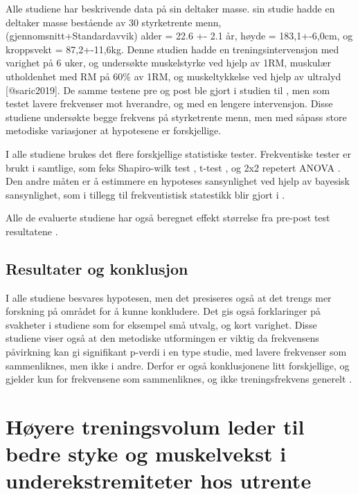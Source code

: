 \documentclass[
]{book}
\begin{document}
Alle studiene har beskrivende data på sin deltaker masse. \citep{saric2019} sin studie hadde en deltaker masse bestående av 30 styrketrente menn, (gjennomsnitt+Standardavvik) alder = 22.6 +- 2.1 år, høyde = 183,1+-6,0cm, og kroppsvekt = 87,2+-11,6kg. Denne studien hadde en treningsintervensjon med varighet på 6 uker, og undersøkte muskelstyrke ved hjelp av 1RM, muskulær utholdenhet med RM på 60\% av 1RM, og muskeltykkelse ved hjelp av ultralyd {[}@saric2019{]}. De samme testene pre og post ble gjort i studien til \citep{brigatto2019}, men som testet lavere frekvenser mot hverandre, og med en lengere intervensjon. Disse studiene undersøkte begge frekvens på styrketrente menn, men med såpass store metodiske variasjoner at hypotesene er forskjellige.

I alle studiene brukes det flere forskjellige statistiske tester. Frekventiske tester er brukt i samtlige, som feks Shapiro-wilk test \citep{brigatto2019, johnsen2021, lasevicius2019}, t-test \citet{brigatto2019}, og 2x2 repetert ANOVA \citep{brigatto2019, johnsen2021} . Den andre måten er å estimmere en hypoteses sansynlighet ved hjelp av bayesisk sansynlighet, som i tillegg til frekventistisk statestikk blir gjort i \citep{saric2019}.

Alle de evaluerte studiene har også beregnet effekt størrelse fra pre-post test resultatene \citep{brigatto2019, gentil2018, johnsen2021, saric2019, lasevicius2019}.

\hypertarget{resultater-og-konklusjon}{%
\section{\texorpdfstring{\textbf{Resultater og konklusjon}}{Resultater og konklusjon}}\label{resultater-og-konklusjon}}

I alle studiene besvares hypotesen, men det presiseres også at det trengs mer forskning på området for å kunne konkludere. Det gis også forklaringer på svakheter i studiene som for eksempel små utvalg, og kort varighet. Disse studiene viser også at den metodiske utformingen er viktig da frekvensens påvirkning kan gi signifikant p-verdi i en type studie, med lavere frekvenser som sammenliknes, men ikke i andre. Derfor er også konklusjonene litt forskjellige, og gjelder kun for frekvensene som sammenliknes, og ikke treningsfrekvens generelt \citep{johnsen2021, brigatto2019, gentil2018, saric2019, lasevicius2019}.

\hypertarget{huxf8yere-treningsvolum-leder-til-bedre-styke-og-muskelvekst-i-underekstremiteter-hos-utrente}{%
\chapter{Høyere treningsvolum leder til bedre styke og muskelvekst i underekstremiteter hos utrente}\label{huxf8yere-treningsvolum-leder-til-bedre-styke-og-muskelvekst-i-underekstremiteter-hos-utrente}}
\end{document}
